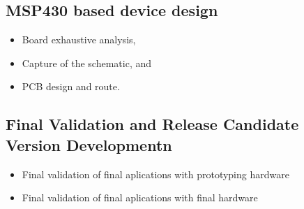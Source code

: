 		\begin{comment}
		\subsection{Final aplication develop}
		\begin{itemize}
		\item Obtention of a shimmer final aplication,
		\item Obtention of a Android aplication, and
		\item Test the whole system in its real use.
		\end{itemize}
		
	
		\end{comment}

		\subsection{MSP430 based device design}
		\label{ssec:device.design}	
		\begin{itemize}
		\item Board exhaustive analysis,
		\item Capture of the schematic, and
		\item PCB design and route.
		\end{itemize}

		\subsection{Final Validation and Release Candidate Version Developmentn}
		\label{ssec:Final.Validation}	
		\begin{itemize}
		\item Final validation of final aplications with prototyping hardware
		\item Final validation of final aplications with final hardware
		\end{itemize}
		
